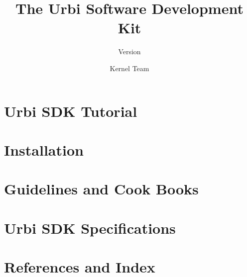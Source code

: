 \documentclass[openright,twoside,11pt]{book}
\title{The Urbi Software Development Kit}
\subtitle{Version \VcsDescription}
\author{Kernel Team}
\begin{document}
\maketitle



\tableofcontents

\part{Urbi SDK Tutorial}
\label{part:tut}





\part{Installation}
\label{part:install}


\part{Guidelines and Cook Books}
\label{part:guide}



\part{Urbi SDK Specifications}
\label{part:specs}


\part{References and Index}
\label{part:ref}

\printindex
\end{document}

